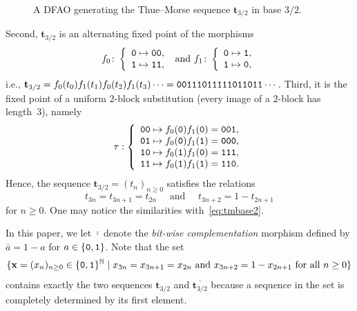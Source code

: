 \documentclass[12pt,reqno]{article}
\newcommand{\cA}{\{{\tt 0},{\tt 1}\}}
\begin{document}
\begin{definition}
\begin{figure}
\begin{center}
\begin{tikzpicture}
\end{tikzpicture}
\end{center}
\caption{A DFAO generating the Thue--Morse sequence $\mathbf{t}_{3/2}$ in base $3/2$.}
\label{Fig: DFAOt32}
\end{figure}
Second, $\mathbf{t}_{3/2}$ is an alternating fixed point of the morphisms \cite[Sec.~3]{RigSti1}
    \begin{equation}\label{eq:alternateTM}
  f_0 \colon \left\{\begin{array}{l}
                      {\tt 0} \mapsto {\tt 00}, \\
                      {\tt 1} \mapsto {\tt 11},\\
                    \end{array}\right.\text{ and }
  f_1\colon \left\{\begin{array}{l}
                      {\tt 0} \mapsto {\tt 1},\\
                      {\tt 1} \mapsto {\tt 0},\\
                    \end{array}\right.
                \end{equation}
                i.e., $\mathbf{t}_{3/2}=f_0(t_0)f_1(t_1)f_0(t_2)f_1(t_3)\cdots={\tt 00111011111011011}\cdots $. Third, it is the fixed point of a uniform $2$-block substitution (every image of a $2$-block has length~$3$),  namely
\begin{equation}\label{eq:tau}
  \tau:\left\{
  \begin{array}{l}
    {\tt 00}\mapsto f_0({\tt 0})f_1({\tt 0})  = {\tt 001},\\
    {\tt 01}\mapsto f_0({\tt 0})f_1({\tt 1})  =  {\tt 000},\\
    {\tt 10}\mapsto f_0({\tt 1})f_1({\tt 0})  =  {\tt 111},\\
    {\tt 11}\mapsto f_0({\tt 1})f_1({\tt 1})  =  {\tt 110}.\\
  \end{array}\right.
\end{equation}
Hence, the sequence $\mathbf{t}_{3/2}=(t_n)_{n\ge 0}$ satisfies the relations
\begin{equation}
  \label{eq:t32relations}
  t_{3n}=t_{3n+1}=t_{2n} \quad\text{ and }\quad 
t_{3n+2}=1-t_{2n+1}
\end{equation}
for $n\ge 0$. One may notice the similarities with~\eqref{eq:tmbase2}.
\end{definition}

In this paper,  we let $\bar{\cdot}$ denote the {\em bit-wise complementation} morphism defined by $\bar{a}=1-a$ for $a\in\cA$. 
Note that the set
\[
  \{\mathbf{x}=(x_n)_{n\ge 0}\in\cA^\mathbb{N} \mid x_{3n}=x_{3n+1}=x_{2n} \text{ and }
  x_{3n+2}=1-x_{2n+1} \text{ for all $n\ge 0$}\}
\]
contains exactly the two sequences $\mathbf{t}_{3/2}$ and $\overline{\mathbf{t}_{3/2}}$ because a sequence in the set is completely determined by its first element.
\end{document}
